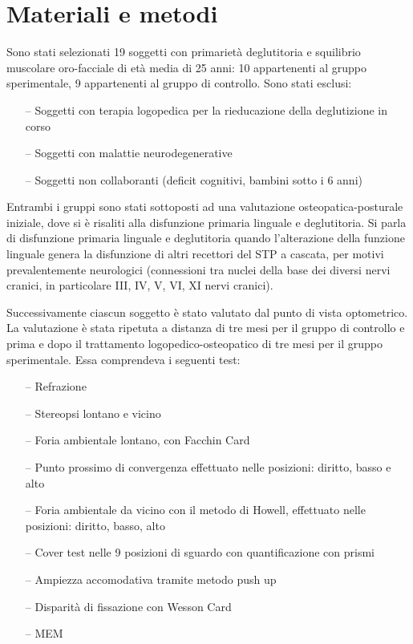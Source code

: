 \section{Materiali e metodi}

Sono stati selezionati 19 soggetti con primarietà deglutitoria e squilibrio muscolare oro-facciale di età media di 25 anni:
10 appartenenti al gruppo sperimentale, 9 appartenenti al gruppo di controllo. Sono stati esclusi:

\begin{itemize}
 \itemsep-0.5em
 \item[--]Soggetti con terapia logopedica per la rieducazione della deglutizione in corso
 \item[--]Soggetti con malattie neurodegenerative
 \item[--]Soggetti non collaboranti (deficit cognitivi, bambini sotto i 6 anni)
\end{itemize}

Entrambi i gruppi sono stati sottoposti ad una valutazione osteopatica-posturale iniziale, dove si è risaliti alla
disfunzione primaria linguale e deglutitoria. Si parla di disfunzione primaria linguale e deglutitoria quando l’alterazione
della funzione linguale genera la disfunzione di altri recettori del STP a cascata, per motivi prevalentemente neurologici
(connessioni tra nuclei della base dei diversi nervi cranici, in particolare III, IV, V, VI, XI nervi cranici).

Successivamente ciascun soggetto è stato valutato dal punto di vista optometrico. La valutazione è stata ripetuta a
distanza di tre mesi per il gruppo di controllo e prima e dopo il trattamento logopedico-osteopatico di tre mesi per il
gruppo sperimentale. Essa comprendeva i seguenti test:

\begin{itemize}
 \itemsep-0.5em
 \item[--]Refrazione
 \item[--]Stereopsi lontano e vicino
 \item[--]Foria ambientale lontano, con Facchin Card
 \item[--]Punto prossimo di convergenza effettuato nelle posizioni: diritto, basso e alto
 \item[--]Foria ambientale da vicino con il metodo di Howell, effettuato nelle posizioni: diritto, basso, alto
 \item[--]Cover test nelle 9 posizioni di sguardo con quantificazione con prismi
 \item[--]Ampiezza accomodativa tramite metodo push up
 \item[--]Disparità di fissazione con Wesson Card
 \item[--]MEM
 \end{itemize}
 

